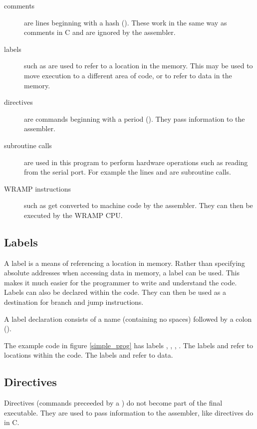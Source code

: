\begin{description}
\item[comments] are lines beginning with a hash (\src{\#}).  These work in 
the same way as \src{//} comments in C and are ignored by the assembler.
%
\item[labels] such as  are used to refer to a location in the
memory.  This may be used to move execution to a different area of code,
or to refer to data in the memory.
%
\item[directives] are commands beginning with a period ().  They
pass information to the assembler.
%
\item[subroutine calls] are used in this program to perform hardware
operations such as reading from the serial port.  For example the
lines  and  are subroutine calls.
%
\item[WRAMP instructions] such as   get 
converted to machine code by the assembler.  They can then be executed by the 
WRAMP CPU.
%
\end{description}

\subsection{Labels}
A label is a means of referencing a location in memory.  Rather than
specifying absolute addresses when accessing data in memory, a label
can be used.  This makes it much easier for the programmer to write
and understand the code.  Labels can also be declared within the
code. They can then be used as a destination for branch and jump
instructions.

A label declaration consists of a name (containing no spaces) followed
by a colon (\src{:}).

The example code in figure \ref{simple_prog} has labels ,
, , .  The labels
 and  refer to locations within the code.  The
labels  and  refer to data.





\subsection{Directives}
Directives (commands preceeded by a ) do not become part of the
final executable.  They are used to pass information to the assembler,
like \src{\#} directives do in C.


